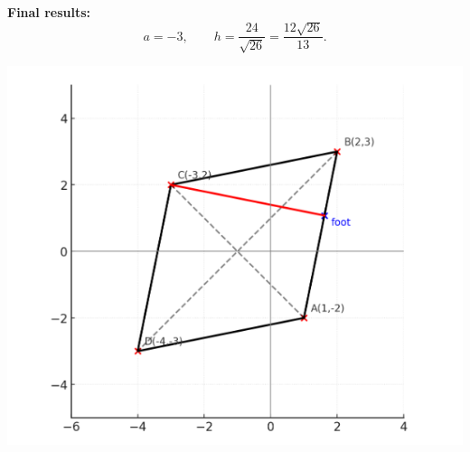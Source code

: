 \documentclass[journal]{IEEEtran}
\begin{document}
\bigskip

\noindent\textbf{Final results:}
\begin{equation}
\boxed{a=-3},\qquad \boxed{h=\dfrac{24}{\sqrt{26}}=\dfrac{12\sqrt{26}}{13}}.
\end{equation}

\bigskip

\begin{center}
    \includegraphics[width=0.8\columnwidth]{figs/fig4.png}
\end{center}
\end{document}
